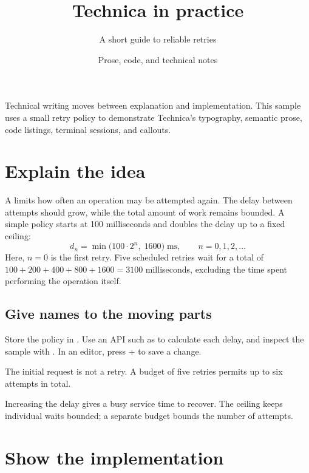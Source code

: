 \documentclass{article}
\title{Technica in practice}
\author{A short guide to reliable retries}
\date{Prose, code, and technical notes}
\begin{document}
\maketitle

Technical writing moves between explanation and implementation. This sample
uses a small retry policy to demonstrate Technica's typography, semantic prose,
code listings, terminal sessions, and callouts.

\section{Explain the idea}

A  limits how often an operation may be attempted again.
The delay between attempts should grow, while the total amount of work remains
bounded. A simple policy starts at 100 milliseconds and doubles the delay up
to a fixed ceiling:
\[
    d_n = \min\bigl(100 \cdot 2^n,\;1600\bigr)\;\mathrm{ms},
    \qquad n = 0,1,2,\ldots
\]
Here, $n=0$ is the first retry. Five scheduled retries wait for a total of
$100 + 200 + 400 + 800 + 1600 = 3100$ milliseconds, excluding the time spent
performing the operation itself.

\subsection{Give names to the moving parts}

Store the policy in . Use an API such as
 to calculate each delay, and inspect the sample with
. In an editor, press  + 
to save a change.

\begin{note}
The initial request is not a retry. A budget of five retries permits up to
six attempts in total.
\end{note}

\begin{explanation}
Increasing the delay gives a busy service time to recover. The ceiling keeps
individual waits bounded; a separate budget bounds the number of attempts.
\end{explanation}

\newpage
\section{Show the implementation}
\label{sec:implementation}
\end{document}

